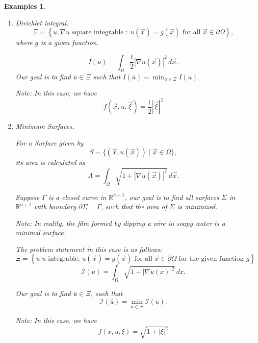 \documentclass[12pt]{report}
\newtheorem{examples}{Examples}[section]
\begin{document}
\begin{examples}
\begin{enumerate}
Our goal is to find a function $\bar{u} \in \Xi$ such that
\[
I(\bar{u}) \leq I(u) \quad \text{for all } u \in \Xi.
\]

Equivalently, it is to find $\bar{u} \in \Xi$ such that
\[
I(\bar{u}) = \min_{u \in \Xi} I(u).
\tag{6}
\]

\textit{Notes:}
\begin{itemize}
    \item $\int_\Omega$ can represent a double or triple integral.
    \item $d\vec{x}$ corresponds to $dx_1 dx_2$ or $dx_1 dx_2 dx_3$ depending on the context.
\end{itemize}

\item Dirichlet integral. \[
\Xi = \left\{
u, \nabla u \text{ square integrable} \; : \;
u(\vec{x}) = g(\vec{x}) \text{ for all } \vec{x} \in \partial \Omega
\right\},
\]
where $g$ is a given function.

\[
I(u) = \int_\Omega \frac{1}{2} |\nabla u(\vec{x})|^2 \, d\vec{x}.
\]
Our goal is to find \(\bar{u} \in \Xi\) such that \(I(\bar{u}) = \min_{u \in \Xi} I(u).\)

Note: In this case, we have 
\[
f(\vec{x}, u, \vec{\xi}) = \frac{1}{2} |\vec{\xi}|^2
\]

\item Minimum Surfaces. 

For a Surface given by \[
S = \{ (\vec{x}, u(\vec{x})) \mid \vec{x} \in \Omega \},
\]
its area is calculated as \[
A = \int_{\Omega} \sqrt{1 + |\nabla u(\vec{x})|^2} \, d\vec{x}.
\]

Suppose \(\Gamma\) is a closed curve in \(\mathbb{R}^{n+1}\), our goal is to find all surfaces \( \Sigma \) in \( \mathbb{R}^{n+1} \) with boundary \( \partial \Sigma = \Gamma \), such that the area of \( \Sigma \) is minimized.

Note: In reality, the film formed by dipping a wire in soapy water is a minimal surface. 

The problem statement in this case is as follows:
\[
\Xi = \left\{ u | u \text{ integrable, } u(\vec{x}) = g(\vec{x}) \text{ for all } \vec{x} \in \partial \Omega \text{ for the given function } g \right\}
\]
\[
\mathcal{I}(u) = \int_{\Omega} \sqrt{1 + |\nabla u(x)|^2} \, dx.
\]

Our goal is to find \( \bar{u} \in \Xi \), such that
\[
\mathcal{I}(\bar{u}) = \min_{u \in \Xi} \mathcal{I}(u).
\]

Note: In this case, we have
\[
f(x, u, \xi) = \sqrt{1 + |\xi|^2}
\]


\end{enumerate}
\end{examples}
\end{document}
